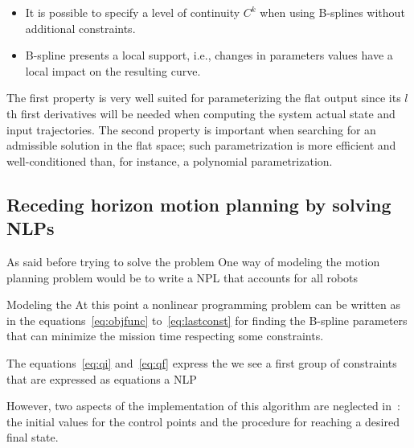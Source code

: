 \documentclass[eprint]{actapoly}
\begin{document}
\begin{itemize}


 \item It is possible to specify a level of continuity $C^k$ when using B-splines without
 additional constraints.
 
 \item B-spline presents a local support, i.e., changes in parameters values have a local
 impact on the resulting curve.
 
 
\end{itemize}

The first property is very well suited for parameterizing the flat output since
its $l$th first derivatives will be needed when computing the system actual state
and input trajectories. The second property is important when searching for an
admissible solution in the flat space; such parametrization is more efficient
and well-conditioned than, for instance, a polynomial parametrization.

\subsection{Receding horizon motion planning by solving NLPs}


As said before trying to solve the problem 
One way of modeling the motion planning problem would be to write a NPL
that accounts for all robots 

Modeling the 
At this point a nonlinear programming problem can be written as in the
equations~\ref{eq:objfunc} to~\ref{eq:lastconst} for finding the
B-spline parameters that can minimize the mission time respecting some constraints.

The equations~\ref{eq:qi} and~\ref{eq:qf} express the we see a first group of constraints that are expressed
as equations
a NLP 


However, two aspects of the implementation of this algorithm are neglected 
in~\cite{Defoort2007a}: the initial values for
the control points and the procedure for reaching a desired final state.
\end{document}
